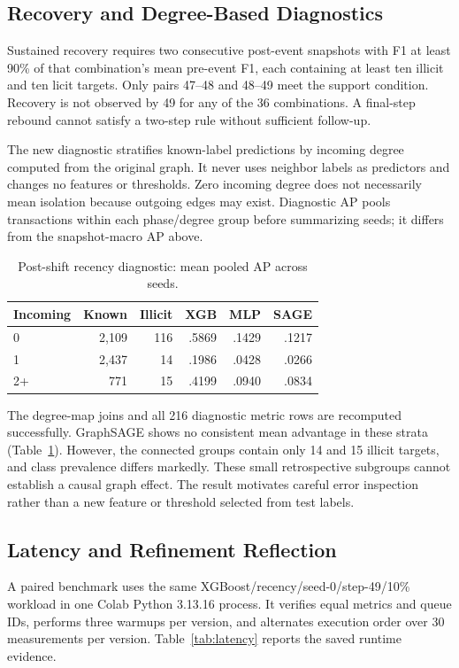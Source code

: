 \documentclass[10pt,twocolumn,letterpaper]{article}
\begin{document}
\subsection{Recovery and Degree-Based Diagnostics}
Sustained recovery requires two consecutive post-event snapshots with F1 at least 90\% of that combination's mean pre-event F1, each containing at least ten illicit and ten licit targets. Only pairs 47--48 and 48--49 meet the support condition. Recovery is not observed by 49 for any of the 36 combinations. A final-step rebound cannot satisfy a two-step rule without sufficient follow-up.

The new diagnostic stratifies known-label predictions by incoming degree computed from the original graph. It never uses neighbor labels as predictors and changes no features or thresholds. Zero incoming degree does not necessarily mean isolation because outgoing edges may exist. Diagnostic AP pools transactions within each phase/degree group before summarizing seeds; it differs from the snapshot-macro AP above.

\begin{table}[t]\caption{Post-shift recency diagnostic: mean pooled AP across seeds.}\centering\footnotesize\setlength{\tabcolsep}{3pt}
\begin{tabular}{lrrrrr}\toprule
Incoming & Known & Illicit & XGB & MLP & SAGE\\\midrule
0 & 2,109 & 116 & .5869 & .1429 & .1217\\
1 & 2,437 & 14 & .1986 & .0428 & .0266\\
2+ & 771 & 15 & .4199 & .0940 & .0834\\\bottomrule
\end{tabular}\label{tab:degree}\end{table}

The degree-map joins and all 216 diagnostic metric rows are recomputed successfully. GraphSAGE shows no consistent mean advantage in these strata (Table~\ref{tab:degree}). However, the connected groups contain only 14 and 15 illicit targets, and class prevalence differs markedly. These small retrospective subgroups cannot establish a causal graph effect. The result motivates careful error inspection rather than a new feature or threshold selected from test labels.

\subsection{Latency and Refinement Reflection}
A paired benchmark uses the same XGBoost/recency/seed-0/step-49/10\% workload in one Colab Python 3.13.16 process. It verifies equal metrics and queue IDs, performs three warmups per version, and alternates execution order over 30 measurements per version. Table~\ref{tab:latency} reports the saved runtime evidence.
\end{document}
